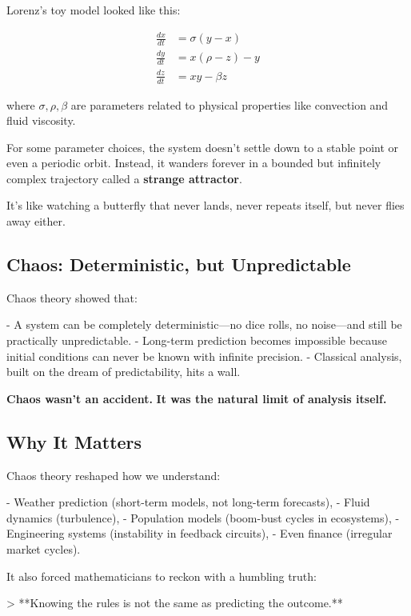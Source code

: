 Lorenz’s toy model looked like this:

\[
\begin{aligned}
\frac{dx}{dt} &= \sigma(y - x) \\
\frac{dy}{dt} &= x(\rho - z) - y \\
\frac{dz}{dt} &= xy - \beta z
\end{aligned}
\]

where \( \sigma, \rho, \beta \) are parameters related to physical properties like convection and fluid viscosity.

For some parameter choices, the system doesn’t settle down to a stable point or even a periodic orbit.  
Instead, it wanders forever in a bounded but infinitely complex trajectory called a \textbf{strange attractor}.

It’s like watching a butterfly that never lands, never repeats itself, but never flies away either.

\subsection*{Chaos: Deterministic, but Unpredictable}

Chaos theory showed that:

- A system can be completely deterministic—no dice rolls, no noise—and still be practically unpredictable.
- Long-term prediction becomes impossible because initial conditions can never be known with infinite precision.
- Classical analysis, built on the dream of predictability, hits a wall.

\smallskip

\textbf{Chaos wasn't an accident.}  
\textbf{It was the natural limit of analysis itself.}

\subsection*{Why It Matters}

Chaos theory reshaped how we understand:

- Weather prediction (short-term models, not long-term forecasts),
- Fluid dynamics (turbulence),
- Population models (boom-bust cycles in ecosystems),
- Engineering systems (instability in feedback circuits),
- Even finance (irregular market cycles).

It also forced mathematicians to reckon with a humbling truth:

> **Knowing the rules is not the same as predicting the outcome.**

